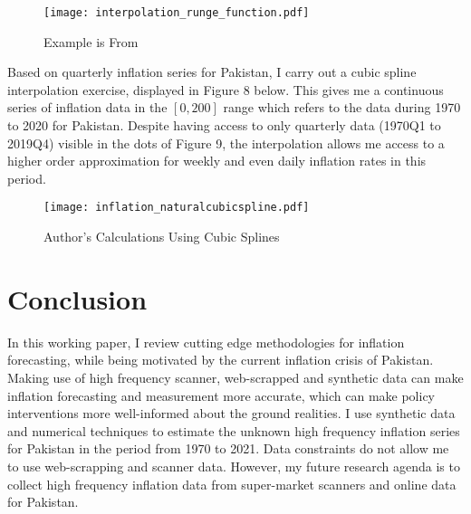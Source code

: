 \documentclass[12pt]{article}
\newcommand{\1}{\mathbbm 1}
\begin{document}
		
		
		
		
		
		
		\begin{figure}[H]
			\begin{Center}
				\texttt{[image: interpolation\_runge\_function.pdf]}
				\caption{Example is From \cite{okten2019first}}
			\end{Center}
		\end{figure}
		
		
		Based on quarterly inflation series for Pakistan, I carry out a cubic spline interpolation exercise, displayed in Figure 8 below. This gives me a continuous series of inflation data in the $[0,200]$ range which refers to the data during 1970 to 2020 for Pakistan. Despite having access to only quarterly data (1970Q1 to 2019Q4) visible in the dots of Figure 9, the interpolation allows me access to a higher order approximation for weekly and even daily inflation rates in this period. 
		
		
		
		
		
		\begin{figure}[H]
			\begin{Center}
				\texttt{[image: inflation\_naturalcubicspline.pdf]}
				\caption{Author's Calculations Using Cubic Splines}
			\end{Center}
		\end{figure}
		
		
		
		
		
		
		
		
		
		
		
		
		
		
		
		
		
		
		\section{Conclusion}
		
		In this working paper, I review cutting edge methodologies for inflation forecasting, while being motivated by the current inflation crisis of Pakistan. Making use of high frequency scanner, web-scrapped and synthetic data can make inflation forecasting and measurement more accurate, which can make policy interventions more well-informed about the ground realities. I use synthetic data and numerical techniques to estimate the unknown high frequency inflation series for Pakistan in the period from 1970 to 2021. Data constraints do not allow me to use web-scrapping and scanner data. However, my future research agenda is to collect high frequency inflation data from super-market scanners and online data for Pakistan. 
		
\end{document}
